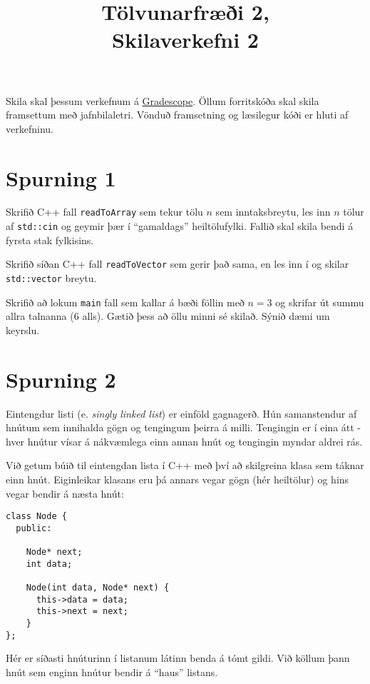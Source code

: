 \documentclass{article}
\title{Tölvunarfræði 2, \semester \\ Skilaverkefni 2}
\author{}
\begin{document}
\maketitle
{}

Skila skal þessum verkefnum á \href{https://gradescope.com/courses/5640}{Gradescope}. Öllum forritskóða skal skila framsettum með jafnbilaletri. Vönduð framsetning og læsilegur kóði er hluti af verkefninu.

\section{Spurning 1}
Skrifið C++ fall \texttt{readToArray} sem tekur tölu $n$ sem inntaksbreytu, les inn $n$ tölur af \texttt{std::cin} og geymir þær í ``gamaldags'' heiltölufylki. Fallið skal skila bendi á fyrsta stak fylkisins.

Skrifið síðan C++ fall \texttt{readToVector} sem gerir það sama, en les inn í og skilar \texttt{std::vector} breytu.

Skrifið að lokum \texttt{main} fall sem kallar á bæði föllin með $n = 3$ og skrifar út summu allra talnanna (6 alls). Gætið þess að öllu minni sé skilað. Sýnið dæmi um keyrslu.

\section{Spurning 2}
Eintengdur listi (e. \emph{singly linked list}) er einföld gagnagerð. Hún samanstendur af hnútum sem innihalda gögn og tengingum þeirra á milli. Tengingin er í eina átt - hver hnútur vísar á nákvæmlega einn annan hnút og tengingin myndar aldrei rás.

Við getum búið til eintengdan lista í C++ með því að skilgreina klasa sem táknar einn hnút. Eiginleikar klasans eru þá annars vegar gögn (hér heiltölur) og hins vegar bendir á næsta hnút:

\begin{verbatim}
class Node {
  public:
    
    Node* next;
    int data;
    
    Node(int data, Node* next) {
      this->data = data;
      this->next = next;
    }    
};
\end{verbatim}

Hér er síðasti hnúturinn í listanum látinn benda á tómt gildi. Við köllum þann hnút sem enginn hnútur bendir á ``haus'' listans.
\end{document}
